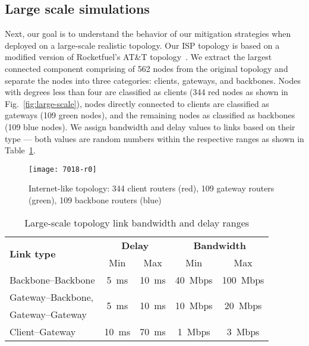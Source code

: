 \subsection{Large scale simulations}
\label{sec:largescale}


Next, our goal is to understand the behavior of our mitigation strategies when deployed on a large-scale realistic topology. Our ISP topology is based on a modified version of Rocketfuel's AT\&T topology~\cite{rocketfuel}.
We extract the largest connected component comprising of 562 nodes from the original topology and separate the nodes into three categories: clients, gateways, and backbones. Nodes with degrees less than four are classified as clients (344 red nodes as shown in Fig.~\ref{fig:large-scale}), nodes directly connected to clients are classified as gateways (109 green nodes), and the remaining nodes as classified as backbones (109 blue nodes). 
We assign bandwidth and  delay values to links based on their type --- both values are random numbers within the respective ranges as shown in Table~\ref{tab:large-scale}.

\begin{figure}[htbp]
  \centering
  \texttt{[image: 7018-r0]}
  \caption{Internet-like topology: 344 client routers (red), 109 gateway routers (green), 109 backbone routers (blue)}
  \label{fig:large-scale-topo}
\end{figure}

\begin{table}[htbp]
\centering
\caption{Large-scale topology link bandwidth and delay ranges}
\label{tab:large-scale}
\begin{tabular}{|l||c|c||c|c|}
  \hline
  \multirow{2}{*}{\bf Link type} &  \multicolumn{2}{|c||}{\bf Delay} &  \multicolumn{2}{|c|}{\bf Bandwidth} \tabularnewline
  \cline{2-5}
                        &  Min & Max                       &  Min & Max \tabularnewline
  \hline \hline
  Backbone--Backbone    & 5~ms & 10~ms   & 40~Mbps & 100~Mbps \tabularnewline
  \hline
  Gateway--Backbone,    & \multirow{2}{*}{5~ms} & \multirow{2}{*}{10~ms}   
                        & \multirow{2}{*}{10~Mbps} & \multirow{2}{*}{20~Mbps} \tabularnewline
  Gateway--Gateway      & & & & \\
  \hline
  Client--Gateway       & 10~ms & 70~ms   & 1~Mbps  & 3~Mbps \\
  \hline

\end{tabular}
\end{table}

